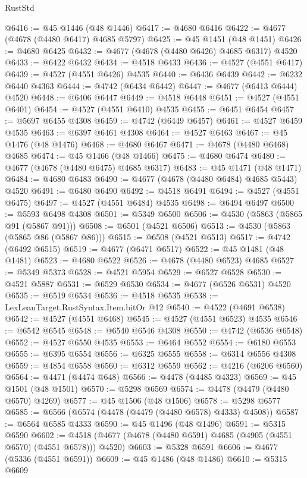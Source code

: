 \begin{lexlean}{RustStd}
\begin{coremodule}
@6416 := @45 @1446 (@48 @1446)
@6417 := @4680 @6416
@6422 := @4677 (@4678 (@4480 @6417) @4685 @5797)
@6425 := @45 @1451 (@48 @1451)
@6426 := @4680 @6425
@6432 := @4677 (@4678 (@4480 @6426) @4685 @6317) @4520
@6433 := @6422 @6432
@6434 := @4518 @6433
@6436 := @4527 (@4551 @6417)
@6439 := @4527 (@4551 @6426) @4535
@6440 := @6436 @6439
@6442 := @6232 @6440 @4363
@6444 := @4742 (@6434 @6442)
@6447 := @4677 (@6413 @6444) @4520
@6448 := @6406 @6447
@6449 := @4518 @6448
@6451 := @4527 (@4551 @6401)
@6454 := @4527 (@4551 @6410) @4535
@6455 := @6451 @6454
@6457 := @5697 @6455 @4308
@6459 := @4742 (@6449 @6457)
@6461 := @4527 @6459 @4535
@6463 := @6397 @6461 @4308
@6464 := @4527 @6463
@6467 := @45 @1476 (@48 @1476)
@6468 := @4680 @6467
@6471 := @4678 (@4480 @6468) @4685
@6474 := @45 @1466 (@48 @1466)
@6475 := @4680 @6474
@6480 := @4677 (@4678 (@4480 @6475) @4685 @6317)
@6483 := @45 @1471 (@48 @1471)
@6484 := @4680 @6483
@6490 := @4677 (@4678 (@4480 @6484) @4685 @5443) @4520
@6491 := @6480 @6490
@6492 := @4518 @6491
@6494 := @4527 (@4551 @6475)
@6497 := @4527 (@4551 @6484) @4535
@6498 := @6494 @6497
@6500 := @5593 @6498 @4308
@6501 := @5349 @6500
@6506 := @4530 (@5863 (@5865 @91 (@5867 @91)))
@6508 := @6501 (@4521 @6506)
@6513 := @4530 (@5863 (@5865 @86 (@5867 @86)))
@6515 := @6508 (@4521 @6513)
@6517 := @4742 (@6492 @6515)
@6519 := @4677 (@6471 @6517)
@6522 := @45 @1481 (@48 @1481)
@6523 := @4680 @6522
@6526 := @4678 (@4480 @6523) @4685
@6527 := @5349 @5373
@6528 := @4521 @5954
@6529 := @6527 @6528
@6530 := @4521 @5887
@6531 := @6529 @6530
@6534 := @4677 (@6526 @6531) @4520
@6535 := @6519 @6534
@6536 := @4518 @6535
@6538 := LexLeanTarget.RustSyntax.Item.bitOr @12
@6540 := @4522 (@4691 @6538)
@6542 := @4527 (@4551 @6468)
@6545 := @4527 (@4551 @6523) @4535
@6546 := @6542 @6545
@6548 := @6540 @6546 @4308
@6550 := @4742 (@6536 @6548)
@6552 := @4527 @6550 @4535
@6553 := @6464 @6552
@6554 := @6180 @6553
@6555 := @6395 @6554
@6556 := @6325 @6555
@6558 := @6314 @6556 @4308
@6559 := @4854 @6558
@6560 := @6312 @6559
@6562 := @4216 (@6206 @6560)
@6564 := @4471 (@4474 @648)
@6566 := @4478 (@4485 @4323)
@6569 := @45 @1501 (@48 @1501)
@6570 := @5298 @6569
@6574 := @4478 (@4479 (@4480 @6570) @4269)
@6577 := @45 @1506 (@48 @1506)
@6578 := @5298 @6577
@6585 := @6566 (@6574 (@4478 (@4479 (@4480 @6578) @4333) @4508))
@6587 := @6564 @6585 @4333
@6590 := @45 @1496 (@48 @1496)
@6591 := @5315 @6590
@6602 := @4518 (@4677 (@4678 (@4480 @6591) @4685 (@4905 (@4551 @6570) (@4551 @6578))) @4520)
@6603 := @5328 @6591
@6606 := @4677 (@5336 (@4551 @6591))
@6609 := @45 @1486 (@48 @1486)
@6610 := @5315 @6609

\end{coremodule}
\end{lexlean}
